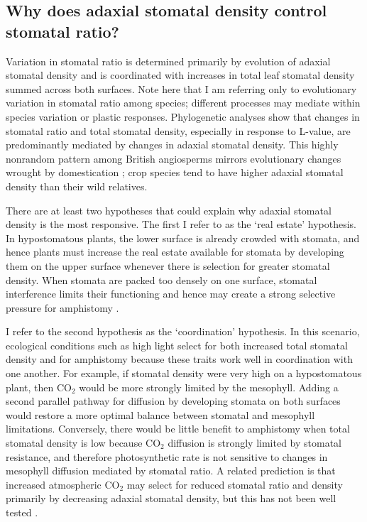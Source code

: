 \documentclass[12pt, oneside]{article}
\newcommand{\el}{L-value}
\begin{document}
\subsection*{Why does adaxial stomatal density control stomatal ratio?}

Variation in stomatal ratio is determined primarily by evolution of adaxial stomatal density and is coordinated with increases in total leaf stomatal density summed across both surfaces. Note here that I am referring only to evolutionary variation in stomatal ratio among species; different processes may mediate within species variation or plastic responses. Phylogenetic analyses show that changes in stomatal ratio and total stomatal density, especially in response to \el, are predominantly mediated by changes in adaxial stomatal density. This highly nonrandom pattern among British angiosperms mirrors evolutionary changes wrought by domestication \citep{Milla_etal_2013}; crop species tend to have higher adaxial stomatal density than their wild relatives. 

There are at least two hypotheses that could explain why adaxial stomatal density is the most responsive. The first I refer to as the `real estate' hypothesis. In hypostomatous plants, the lower surface is already crowded with stomata, and hence plants must increase the real estate available for stomata by developing them on the upper surface whenever there is selection for greater stomatal density. When stomata are packed too densely on one surface, stomatal interference limits their functioning and hence may create a strong selective pressure for amphistomy \citep{Parlange_Waggoner_1970, Dow_etal_2014a}. 

I refer to the second hypothesis as the `coordination' hypothesis. In this scenario, ecological conditions such as high light select for both increased total stomatal density and for amphistomy because these traits work well in coordination with one another. For example, if stomatal density were very high on a hypostomatous plant, then CO$_2$ would be more strongly limited by the mesophyll. Adding a second parallel pathway for diffusion by developing stomata on both surfaces would restore a more optimal balance between stomatal and mesophyll limitations. Conversely, there would be little benefit to amphistomy when total stomatal density is low because CO$_2$ diffusion is strongly limited by stomatal resistance, and therefore photosynthetic rate is not sensitive to changes in mesophyll diffusion mediated by stomatal ratio. A related prediction is that increased atmospheric CO$_2$ may select for reduced stomatal ratio and density primarily by decreasing adaxial stomatal density, but this has not been well tested \citep[but see][]{Woodward_Bazzaz_1988}.
\end{document}
